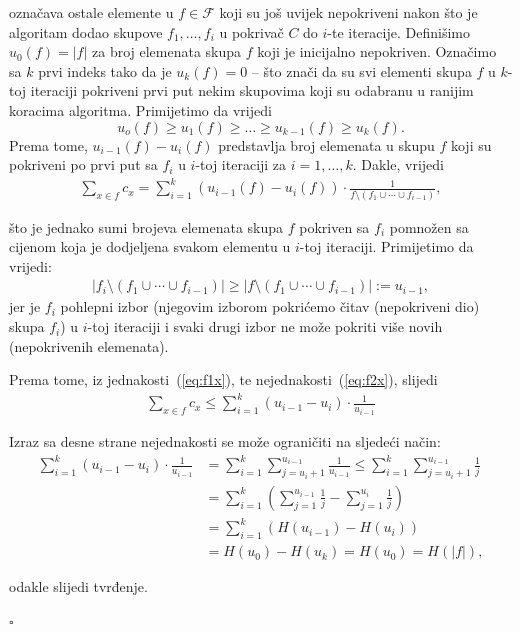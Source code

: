 \documentclass[a4paper, utf8, 11pt, colorlinks]{book}
\newenvironment{proof}{{Dokaz:}}{\hfill$\square$}
\begin{document}
\begin{proof}
	 označava ostale elemente u $f \in \mathcal{F}$ koji su još uvijek nepokriveni nakon što je algoritam dodao skupove $f_1,\ldots, f_i$ u pokrivač $C$ do $i$-te iteracije. Definišimo $u_0(f)=|f|$ za broj elemenata skupa $f$ koji je inicijalno nepokriven. 
	 Označimo sa $k$ prvi indeks tako da je $u_k(f)=0$  -- što znači da su svi elementi skupa $f$ u $k$-toj iteraciji
	 pokriveni prvi put nekim skupovima %
	 koji su odabranu u ranijim koracima algoritma. Primijetimo da vrijedi
	 $$ u_o(f) \geq u_1(f) \geq \ldots \geq u_{k-1}(f) \geq u_k(f).$$
	 Prema tome, $u_{i-1}(f) - u_{i}(f)$ predstavlja broj elemenata u skupu $f$ koji su pokriveni 
	 po prvi put sa $f_i$ u $i$-toj iteraciji za $i=1,\ldots,k$. Dakle, vrijedi
	 \begin{align}\label{eq:q1}
	 	\sum_{x \in f} c_x = \sum_{i=1}^k( u_{i-1}(f) - u_{i}(f)) \cdot \frac{1}{ f \setminus ( f_1 \cup \cdots \cup f_{i-1})},
	 \end{align}
 
   \noindent što je jednako sumi brojeva elemenata skupa $f$ pokriven sa $f_i$ pomnožen sa cijenom koja je dodjeljena svakom elementu u $i$-toj iteraciji. Primijetimo da vrijedi:
 \begin{align}\label{eq:q2x}
 	|f_i \setminus (f_1 \cup \cdots \cup f_{i-1})| \geq | f   \setminus (f_1 \cup \cdots \cup f_{i-1}) | := u_{i-1},
 \end{align}
 jer je $f_i$ pohlepni izbor (njegovim izborom pokrićemo čitav (nepokriveni dio) skupa $f_i$) u $i$-toj iteraciji i svaki drugi izbor ne može pokriti više novih (nepokrivenih elemenata). 
 
 Prema tome, iz jednakosti~(\ref{eq:f1x}), te nejednakosti~(\ref{eq:f2x}), slijedi 
 \begin{align*}
 	\sum_{x \in f} c_x \leq \sum_{i=1}^k ( u_{i-1} - u_{i}) \cdot \frac{1}{u_{i-1}}
 \end{align*}
 
 Izraz sa desne strane nejednakosti se može ograničiti na sljedeći način:
   \begin{align*}
 	   \sum_{i=1}^k ( u_{i-1} - u_{i}) \cdot \frac{1}{u_{i-1}} &= \sum_{i=1}^k \sum_{j=u_i + 1}^{u_{i-1}} \frac{1}{u_{i-1}} \leq \sum_{i=1}^k \sum_{j=u_i + 1}^{u_{i-1}}\frac{1}{j} \\
 	   &= \sum_{i=1}^k \left( \sum_{j=1}^{u_{i-1}}\frac{1}{j} - \sum_{j=1}^{u_{i}}\frac{1}{j} \right) \\
 	   &= \sum_{i=1}^k (H(u_{i-1}) - H(u_i)) \\
    	&= H(u_0) - H(u_k) = H(u_0) = H(|f|),
 \end{align*}
 
 odakle slijedi tvrđenje. 
 
\end{proof}
\end{document}
